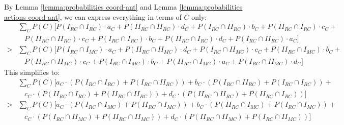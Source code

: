 \documentclass[fleqn,reqno,11pt]{article}
\begin{document}
\noindent By Lemma \ref{lemma:probabilities coord-ant} and Lemma \ref{lemma:probabilities
  actions coord-ant}, we can express everything in terms of $C$ only:
\begin{align*}
  & \textstyle{\sum_{C}} P(C)[P(I_{RC}\cap I_{RC})\cdot a_{C}+P(II_{RC}\cap II_{RC})\cdot d_{C}+P(I_{RC}\cap
  II_{RC})\cdot b_{C}+P(II_{RC}\cap I_{RC})\cdot c_{C} + \\
  & \ \ \ \ P(II_{RC}\cap II_{RC})\cdot c_{C}+P(I_{RC}\cap I_{RC})\cdot b_{C}+P(II_{RC}\cap
  I_{RC})\cdot d_{C}+P(I_{RC}\cap
  II_{RC})\cdot a_{C}] \\
  > & \textstyle{\sum_{C}}P(C)[P(I_{RC}\cap I_{MC})\cdot a_{C}+P(II_{RC}\cap II_{MC})\cdot
  d_{C}+P(I_{RC}\cap II_{MC})\cdot c_{C}+P(II_{RC}\cap I_{MC})\cdot b_{C} + \\
  & \ \ \ \ P(II_{RC}\cap II_{MC})\cdot c_{C}+P(I_{RC}\cap I_{MC})\cdot b_{C}+P(II_{RC}\cap
  I_{MC})\cdot a_{C}+P(I_{RC}\cap II_{MC})\cdot d_{C}]
\end{align*}
This simplifies to:
\begin{align*}
  & \textstyle{\sum_{C}}P(C)[a_{C} \cdot (P(I_{RC}\cap I_{RC}) + P(I_{RC}\cap II_{RC})) + b_{C}
  \cdot (P(I_{RC}\cap II_{RC}) + P(I_{RC}\cap I_{RC})) + 
\\ & \ \ \ \ c_{C} \cdot
  (P(II_{RC}\cap I_{RC}) +P(II_{RC}\cap II_{RC})) + d_{C} \cdot (P(II_{RC}\cap
  II_{RC})+P(II_{RC}\cap I_{RC}))] 
\\ > & \textstyle{\sum_{C}}P(C)[a_{C} \cdot (P(I_{RC}\cap
  I_{MC})+P(II_{RC}\cap I_{MC})) + b_{C} \cdot (P(II_{RC}\cap I_{MC})+P(I_{RC}\cap I_{MC})) + \\
  & \ \ \ \ c_{C} \cdot (P(I_{RC}\cap II_{MC})+P(II_{RC}\cap II_{MC})) + d_{C} \cdot (P(II_{RC}\cap
  II_{MC})+P(I_{RC}\cap II_{MC}))]
\end{align*}
\end{document}
